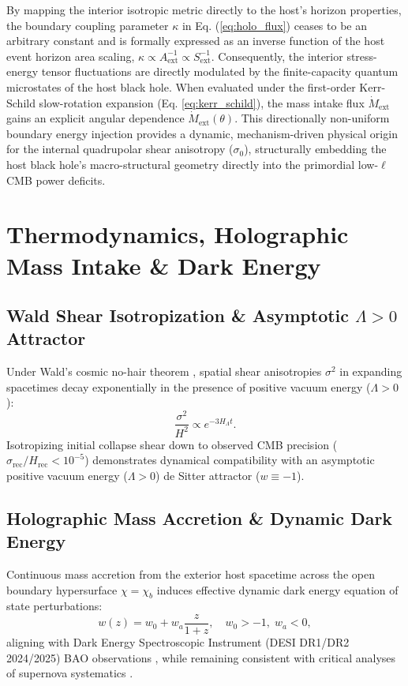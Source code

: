 \documentclass[11pt,a4paper]{article}
\begin{document}
By mapping the interior isotropic metric directly to the host's horizon properties, the boundary coupling parameter $\kappa$ in Eq. (\ref{eq:holo_flux}) ceases to be an arbitrary constant and is formally expressed as an inverse function of the host event horizon area scaling, $\kappa \propto A_{\text{ext}}^{-1} \propto S_{\text{ext}}^{-1}$. Consequently, the interior stress-energy tensor fluctuations are directly modulated by the finite-capacity quantum microstates of the host black hole. When evaluated under the first-order Kerr-Schild slow-rotation expansion (Eq. \ref{eq:kerr_schild}), the mass intake flux $\dot{M}_{\text{ext}}$ gains an explicit angular dependence $\dot{M}_{\text{ext}}(\theta)$. This directionally non-uniform boundary energy injection provides a dynamic, mechanism-driven physical origin for the internal quadrupolar shear anisotropy ($\sigma_0$), structurally embedding the host black hole's macro-structural geometry directly into the primordial low-$\ell$ CMB power deficits.

\section{Thermodynamics, Holographic Mass Intake \& Dark Energy}\label{sec:thermo_dark_energy}

\subsection{Wald Shear Isotropization \& Asymptotic $\Lambda > 0$ Attractor}\label{sec:wald_theorem}
Under Wald's cosmic no-hair theorem \cite{wald1983}, spatial shear anisotropies $\sigma^2$ in expanding spacetimes decay exponentially in the presence of positive vacuum energy ($\Lambda > 0$):
\begin{equation}\label{eq:shear_decay}
    \frac{\sigma^2}{H^2} \propto e^{-3 H_\Lambda t}.
\end{equation}
Isotropizing initial collapse shear down to observed CMB precision ($\sigma_{\text{rec}}/H_{\text{rec}} < 10^{-5}$) demonstrates dynamical compatibility with an asymptotic positive vacuum energy ($\Lambda > 0$) de Sitter attractor ($w \equiv -1$).

\subsection{Holographic Mass Accretion \& Dynamic Dark Energy}\label{sec:mass_intake}
Continuous mass accretion from the exterior host spacetime across the open boundary hypersurface $\chi = \chi_b$ induces effective dynamic dark energy equation of state perturbations:
\begin{equation}\label{eq:eos_dynamic}
    w(z) = w_0 + w_a \frac{z}{1+z}, \quad w_0 > -1, \; w_a < 0,
\end{equation}
aligning with Dark Energy Spectroscopic Instrument (DESI DR1/DR2 2024/2025) BAO observations \cite{desi2024, desi2025}, while remaining consistent with critical analyses of supernova systematics \cite{efstathiou2025}.
\end{document}
